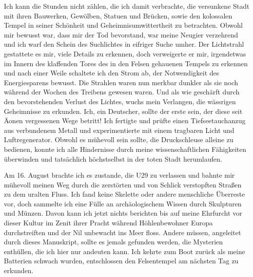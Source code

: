 \documentclass[a4paper]{memoir}
\begin{document}
Ich kann die Stunden nicht zählen, die ich damit verbrachte, die versunkene Stadt mit ihren Bauwerken, Gewölben, Statuen und Brücken, sowie den kolossalen Tempel in seiner Schönheit und Geheimnisumwittertheit zu betrachten. Obwohl mir bewusst war, dass mir der Tod bevorstand, war meine Neugier verzehrend und ich warf den Schein des Suchlichtes in eifriger Suche umher. Der Lichtstrahl gestattete es mir, viele Details zu erkennen, doch verweigerte er mir, irgendetwas im Innern des klaffenden Tores des in den Felsen gehauenen Tempels zu erkennen und nach einer Weile schaltete ich den Strom ab, der Notwendigkeit des Energiesparens bewusst. Die Strahlen waren nun merkbar dunkler als sie noch während der Wochen des Treibens gewesen waren. Und als wie geschärft durch den bevorstehenden Verlust des Lichtes, wuchs mein Verlangen, die wässrigen Geheimnisse zu erkunden. Ich, ein Deutscher, sollte der erste sein, der diese seit Äonen vergessenen Wege betritt! Ich fertigte und prüfte einen Tiefseetauchanzug aus verbundenem Metall und experimentierte mit einem tragbaren Licht und Luftregenerator. Obwohl es mühevoll sein sollte, die Druckschleuse alleine zu bedienen, konnte ich alle Hindernisse durch meine wissenschaftlichen Fähigkeiten überwinden und tatsächlich höchstselbst in der toten Stadt herumlaufen.

Am 16. August brachte ich es zustande, die U29 zu verlassen und bahnte mir mühevoll meinen Weg durch die zerstörten und von Schlick verstopften Straßen zu dem uralten Fluss. Ich fand keine Skelette oder andere menschliche Überreste vor, doch sammelte ich eine Fülle an archäologischem Wissen durch Skulpturen und Münzen. Davon kann ich jetzt nichts berichten bis auf meine Ehrfurcht vor dieser Kultur im Zenit ihrer Pracht während Höhlenbewohner Europa durchstreiften und der Nil unbewacht ins Meer floss. Andere müssen, angeleitet durch dieses Manuskript, sollte es jemals gefunden werden, die Mysterien enthüllen, die ich hier nur andeuten kann. Ich kehrte zum Boot zurück als meine Batterien schwach wurden, entschlossen den Felsentempel am nächsten Tag zu erkunden.
\end{document}
